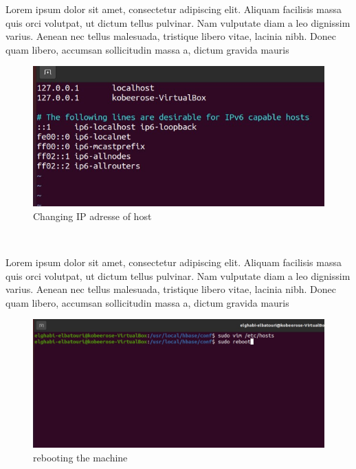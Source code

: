 \begin{spacing}{1.2}
\par Lorem ipsum dolor sit amet, consectetur adipiscing elit. Aliquam facilisis massa quis orci volutpat, ut dictum tellus pulvinar. Nam vulputate diam a leo dignissim varius. Aenean nec tellus malesuada, tristique libero vitae, lacinia nibh. Donec quam libero, accumsan sollicitudin massa a, dictum gravida mauris
\\
\begin{figure}[!htb] 
\begin{center} 
\includegraphics[width=1\linewidth]{Pictures/HBase/Configuring Hbase in Standalone & Pseudo-distributed mode/Installing and Configuring Apache Hbase/Changing IP adresse of host} 
\end{center} 
\caption{Changing IP adresse of host} 
\end{figure}  \FloatBarrier
\\

\par Lorem ipsum dolor sit amet, consectetur adipiscing elit. Aliquam facilisis massa quis orci volutpat, ut dictum tellus pulvinar. Nam vulputate diam a leo dignissim varius. Aenean nec tellus malesuada, tristique libero vitae, lacinia nibh. Donec quam libero, accumsan sollicitudin massa a, dictum gravida mauris
\\
\begin{figure}[!htb] 
\begin{center} 
\includegraphics[width=1\linewidth]{Pictures/HBase/Configuring Hbase in Standalone & Pseudo-distributed mode/Installing and Configuring Apache Hbase/rebooting the machine} 
\end{center} 
\caption{rebooting the machine} 
\end{figure}  \FloatBarrier
\\


\end{spacing}
